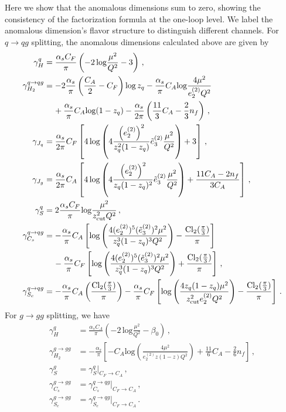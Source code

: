 \documentclass[a4paper,11pt]{article}
\newcommand{\ecf}[2]{e_{#1}^{(#2)}}
\newcommand{\ecflp}[2]{\tilde e_{#1}^{(#2)}}
\def\log{\text{log}}
\def\zcut{z_{\text{cut}}}
\begin{document}
Here we show that the anomalous dimensions sum to zero, showing the consistency of the factorization formula at the one-loop level. We label the anomalous dimension's flavor structure to distinguish different channels.  For $q\to qg$ splitting, the anomalous dimensions calculated above are given by
\begin{align}
\gamma_H^{q} &= \frac{\alpha_s C_F}{\pi}\left(
-2\,\log\frac{\mu^2}{Q^2}-3
\right)\,,\\
\label{eq:collinear_subjets_hard_matching_anom_dim}\gamma_{H_2}^{q\to qg} &= -2\frac{\alpha_s}{\pi}\left(
\frac{C_A}{2}-C_F
\right)\log\, z_q-\frac{\alpha_s}{\pi}C_A\log\frac{4\mu^2}{\ecf{2}{2}Q^2}\nonumber\\
&\hspace{0.4cm}+\frac{\alpha_s}{\pi}C_A \log(1-z_q)-\frac{\alpha_s}{2\pi}\left(
\frac{11}{3}C_A-\frac{2}{3}n_f
\right)\,,\\
\gamma_{J_q} &= \frac{\alpha_s}{2\pi}C_F\left[
4\,  \log\left( 4\frac{\left(\ecf{2}{2}\right)^2}{z_q^2(1-z_q)}\ecflp{3}{2}\frac{\mu^2}{Q^2}  \right)+3
\right]\,,\\
\gamma_{J_g} &= \frac{\alpha_s}{2\pi}C_A\left[
4\,  \log\left( 4\frac{\left(\ecf{2}{2}\right)^2}{z_q(1-z_q)^2} \ecflp{3}{2}\frac{\mu^2}{Q^2}  \right)+\frac{11C_A-2n_f}{3C_A}
\right]\,,\\
\gamma_S^q&=2\frac{\alpha_s C_F}{\pi}\log\frac{\mu^2}{\zcut^2 Q^2}\,,\\
%
\gamma_{C_s}^{q\to qg} &= -\frac{\alpha_s}{\pi}C_A \left[
\log \left( \frac{4(\ecf{2}{2})^5(\ecflp{3}{2})^2\mu^2}{z_q^3(1-z_q)^3Q^2}\right)-\frac{\text{Cl}_2(\frac{\pi}{3})}{\pi}
\right]\nonumber\\
&\hspace{0.4cm}-\frac{\alpha_s}{\pi}C_F\left[
\log \left(\frac{4(\ecf{2}{2})^5(\ecflp{3}{2})^2\mu^2}{z_q^3(1-z_q)^3Q^2}\right)+\frac{\text{Cl}_2(\frac{\pi}{3})}{\pi}
\right]\,,\\
\gamma_{S_c}^{q\to qg} &= -\frac{\alpha_s}{\pi}C_A \left(
\frac{\text{Cl}_2(\frac{\pi}{3})}{\pi}
\right)-\frac{\alpha_s}{\pi}C_F\left[
\log \left( \frac{4 z_q(1-z_q)\mu^2}{\zcut^2\ecf{2}{2}Q^2}\right)-\frac{\text{Cl}_2(\frac{\pi}{3})}{\pi}
\right]\,.
\end{align}
For $g\to gg$ splitting, we have
\begin{align}
\gamma_H^{q} &= \frac{\alpha_s C_A}{\pi}\left(
-2\,\log\frac{\mu^2}{Q^2}-\beta_0
\right)\,,\\
\label{eq:collinear_subjets_hard_matching_anom_dim_glue}\gamma_{H_2}^{g\to gg} &= -\frac{\alpha_s}{\pi}\left[-C_A\log \left( \frac{4\mu^2}{\ecf{2}{2}z(1-z)Q^2} \right)+\frac{11}{6}C_A-\frac{2}{6}n_f\right]\,,\\
\gamma_S^g&=\gamma_S^q\Big|_{C_F\rightarrow C_A}\,,\\
\gamma_{C_s}^{g\to gg}&=\gamma_{C_s}^{q\to qg}\Big|_{C_F\rightarrow C_A}\,,\\
\gamma_{S_c}^{g\to gg}&=\gamma_{S_c}^{q\to qg}\Big|_{C_F\rightarrow C_A}\,.
\end{align}
\end{document}

